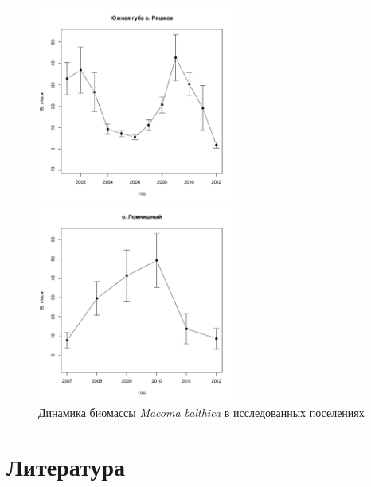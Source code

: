\documentclass[12pt, a4paper]{article}
\begin{document}
\begin{figure}[h]
\begin{minipage}[b]{.46\linewidth}
\begin{center}
\includegraphics[width=65mm]{../White_Sea/Ryashkov_YuG/B_count_dynamic.pdf}
\end{center}
\end{minipage}
%
\hfil %
%
\begin{minipage}[b]{.46\linewidth}
\begin{center}
\includegraphics[width=65mm]{../White_Sea/Lomnishniy/B_count_dynamic.pdf}
\end{center}
\end{minipage}



\caption{Динамика биомассы {\it Macoma balthica} в исследованных поселениях}
\label{ris:Length_max}
\end{figure}

        \section{Литература}
%        
        
%        
        
\end{document}
